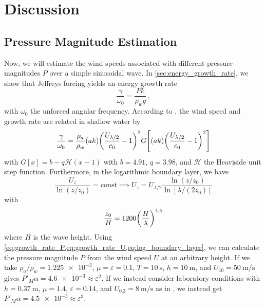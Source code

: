 \documentclass{jfm}
\renewcommand*{\epsilon}{\varepsilon}
\begin{document}
\section{Discussion}

\subsection{Pressure Magnitude Estimation}
Now, we will estimate the wind speeds associated with different pressure
magnitudes $P$ over a simple sinusoidal wave.
In \cref{sec:energy_growth_rate}, we show that Jeffreys forcing yields
an energy growth rate
\begin{equation}
  \frac{\gamma}{\omega_0} = \frac{P k}{\rho_w g} \,,
  \label{eq:growth_rate_P}
\end{equation}
with $\omega_0$ the unforced angular frequency.
According to \citet{donelan2006wave}, the wind speed and growth rate
are related in shallow water by
\begin{equation}
  \frac{\gamma}{\omega_0} = \frac{\rho_a}{\rho_w} (ak)
  \pqty{\frac{U_{\lambda/2}}{c_0} - 1}^2
  G \bqty{(ak)
  \pqty{\frac{U_{\lambda/2}}{c_0} - 1}^2}
  \label{eq:growth_rate_U}
\end{equation}
with $G[x] = b - q \mathcal{H}(x - 1)$ with $b = 4.91$, $q = 3.98$, and
$\mathcal{H}$ the Heaviside unit step function.
Furthermore, in the logarithmic boundary layer, we have
\begin{equation}
  \frac{U_z}{\ln(z/z_0)} = \text{const}
  \implies U_{z} = U_{\lambda/2} \frac{\ln(z/z_0)}{\ln[\lambda/(2 z_0)]}
  \label{eq:log_boundary_layer}
\end{equation}
with \citep{taylor2001dependence}
\begin{equation}
  \frac{z_0}{H} = 1200 \pqty{\frac{H}{\lambda}}^{4.5}
\end{equation}
where $H$ is the wave height.
Using \cref{eq:growth_rate_P,eq:growth_rate_U,eq:log_boundary_layer}, we
can calculate the pressure magnitude $P$ from the wind speed $U$ at an
arbitrary height.
If we take $\rho_a/\rho_w = \num{1.225e-3}$, $\mu = \epsilon = 0.1$, $T
= \SI{10}{\second}$, $h = \SI{10}{\meter}$, and $U_{10} =
\SI{50}{\meter\per\second}$ gives $P'_M \alpha = \num{4.6e-3} \approx
\epsilon^2$.
If we instead consider laboratory conditions with $h=\SI{0.37}{\meter}$,
$\mu = 1.4$, $\epsilon = 0.14$, and $U_{0.3} = \SI{8}{\meter\per\second}$
as in \citet{feddersen2005wind}, we instead get $P'_M \alpha =
\num{4.5e-3} \approx \epsilon^3$.
\end{document}
